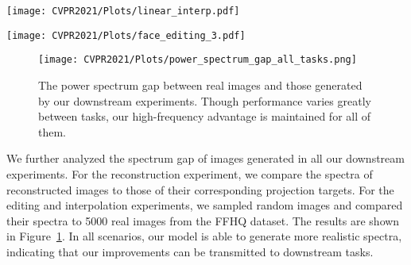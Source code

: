 \documentclass[final]{CVPR2021/cvpr}
\begin{document}
\begin{figure*}[t]
\begin{center}
\texttt{[image: CVPR2021/Plots/linear\_interp.pdf]}
\end{center}
   \caption{Latent space interpolation. In each cluster of images, the left-most and right-most images are the ground truth, taken from the FFHQ dataset. We project them into the generator's latent W-space using the StyleGAN projector, and interpolate between both ends. The top row of each cluster contains images obtained using a StyleGAN2 configuration F model, while the bottom row contains images obtained using the SWAGAN-Bi model. Interpolated StyleGAN2 images show considerable blur around regions of high frequency such as the hair, while the SWAGAN images do not.}
\label{fig:linear_1024}
\end{figure*} 

\begin{figure*}[t]
\begin{center}
\texttt{[image: CVPR2021/Plots/face\_editing\_3.pdf]}
\end{center}
   \caption{Semantic face editing using the latent projection method of \cite{shen2020interpreting}. We modify (from top to bottom): smile, age and hair length.}
\label{fig:face_editing}
\end{figure*} 

\begin{figure}[t]
\begin{center}
\texttt{[image: CVPR2021/Plots/power\_spectrum\_gap\_all\_tasks.png]}
\end{center}
   \caption{The power spectrum gap between real images and those generated by our downstream experiments. Though performance varies greatly between tasks, our high-frequency advantage is maintained for all of them.}
\label{fig:spectrum_encoded}
\end{figure}

We further analyzed the spectrum gap of images generated in all our downstream experiments. For the reconstruction experiment, we compare the spectra of  reconstructed images to those of their corresponding projection targets. For the editing and interpolation experiments, we sampled random images and compared their spectra to 5000 real images from the FFHQ dataset. The results are shown in Figure~\ref{fig:spectrum_encoded}. In all scenarios, our model is able to generate more realistic spectra, indicating that our improvements can be transmitted to downstream tasks.
\end{document}

